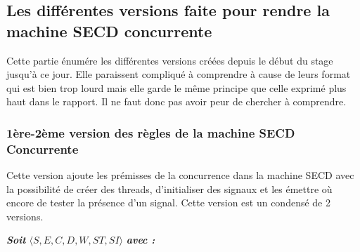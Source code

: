 \documentclass[10pt,a4paper]{article}
\begin{document}
		
			
		\subsection{Les différentes versions faite pour rendre la machine SECD concurrente}
		
			Cette partie énumére les différentes versions créées depuis le début du stage jusqu'à ce jour. Elle paraissent compliqué à comprendre à cause de leurs format qui est bien trop lourd mais elle garde le même principe que celle exprimé plus haut dans le rapport. Il ne faut donc pas avoir peur de chercher à comprendre.
		
			\subsubsection{1ère-2ème version des règles de la machine SECD Concurrente}\label{SECDConc1-2}
				\smallbreak
				Cette version ajoute les prémisses de la concurrence dans la machine SECD avec la possibilité de créer des threads, d'initialiser des signaux et les émettre où encore de tester la présence d'un signal. Cette version est un condensé de 2 versions.
				\bigbreak
					
				\textbf{\textit{Soit}} $\langle S,E,C,D,W,ST,SI\rangle$ \textbf{\textit{avec :}}
					
\end{document}
